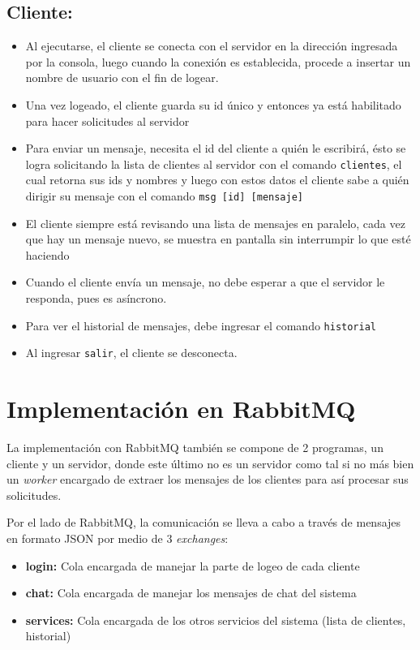 \documentclass[11pt, letter]{article}
\begin{document}
\subsection{Cliente:}
\begin{itemize}
	\item Al ejecutarse, el cliente se conecta con el servidor en la dirección ingresada por la consola, luego cuando la conexión es establecida, procede a insertar un nombre de usuario con el fin de logear.
	\item Una vez logeado, el cliente guarda su id único y entonces ya está habilitado para hacer solicitudes al servidor
	\item Para enviar un mensaje, necesita el id del cliente a quién le escribirá, ésto se logra solicitando la lista de clientes al servidor con el comando \texttt{clientes}, el cual retorna sus ids y nombres y luego con estos datos el cliente sabe a quién dirigir su mensaje con el comando \texttt{msg [id] [mensaje]}
	\item El cliente siempre está revisando una lista de mensajes en paralelo, cada vez que hay un mensaje nuevo, se muestra en pantalla sin interrumpir lo que esté haciendo
	\item Cuando el cliente envía un mensaje, no debe esperar a que el servidor le responda, pues es asíncrono.
	\item Para ver el historial de mensajes, debe ingresar el comando \texttt{historial}
	\item Al ingresar \texttt{salir}, el cliente se desconecta.
\end{itemize}

\section{Implementación en RabbitMQ}

La implementación con RabbitMQ también se compone de 2 programas, un cliente y un servidor, donde este último no es un servidor como tal si no más bien un \textit{worker} encargado de extraer los mensajes de los clientes para así procesar sus solicitudes.

Por el lado de RabbitMQ, la comunicación se lleva a cabo a través de mensajes en formato JSON\cite{RFC8259} por medio de 3 \textit{exchanges}:

\begin{itemize}
	\item \textbf{login:} Cola encargada de manejar la parte de logeo de cada cliente

	\item \textbf{chat:} Cola encargada de manejar los mensajes de chat del sistema

	\item \textbf{services:} Cola encargada de los otros servicios del sistema (lista de clientes, historial)
\end{itemize}
\end{document}
